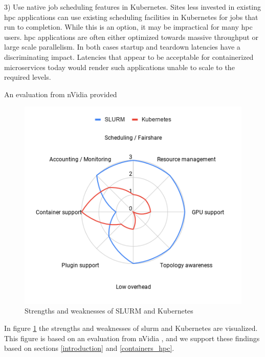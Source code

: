 \documentclass[conference]{IEEEtran}
\begin{document}
3) Use native job scheduling features in Kubernetes. Sites less invested in existing \gls{hpc} applications can use existing scheduling facilities in Kubernetes for jobs that run to completion. While this is an option, it may be impractical for many \gls{hpc} users. \gls{hpc} applications are often either optimized towards massive throughput or large scale parallelism. In both cases startup and teardown latencies have a discriminating impact. Latencies that appear to be acceptable for containerized microservices today would render such applications unable to scale to the required levels.

An evaluation from nVidia provided
\begin{figure}
\centering
\includegraphics[width=\columnwidth]{images/kube_vs_slurm.png}
\caption{Strengths and weaknesses of SLURM and Kubernetes}
\label{fig:kube_vs_slurm}
\end{figure}

In figure \ref{fig:kube_vs_slurm} the strengths and weaknesses of \gls{slurm} and Kubernetes are visualized. This figure is based on an evaluation from nVidia \cite{nvidia-slurm-containers}, and we support these findings based on sections \ref{introduction} and \ref{containers_hpc}.
\end{document}
